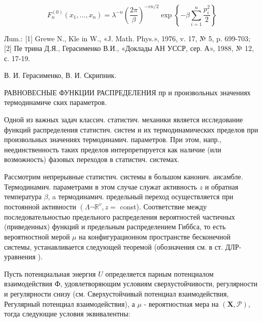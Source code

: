 \documentclass[10pt]{article}
\begin{document}
\[

F_{n}^{(0)}\left(x_{1}, \ldots, x_{n}\right)=\lambda^{-n}\left(\frac{2 \pi}{\beta}\right)^{-v n / 2} \exp \left\{-\beta \sum_{i=1}^{n} \frac{p_{i}^{2}}{2}\right\}

\]



Лum.: [1] Grewe N., Kle in W., «J. Math. Phys.», 1976, v. 17, № 5, p. 699-703; [2] Пе трина Д.Я., Герасименко В.И., «Доклады АН УССР, сер. А», 1988, № 12, с. 17-19.



В. И. Герасименко, В. И. Скрипник.



РАВНОВЕСНЫЕ ФУНКЦИИ РАСПРЕДЕЛЕНИЯ пр и произвольных значениях термодинамиче ских параметров.



Одной из важных задач классич. статистич. механики является исследование функций распределения статистич. систем и их термодинамических пределов при произвольных значениях термодинамич. параметров. При этом, напр., неединственность таких пределов интерпретируется как наличие (или возможность) фазовых переходов в статистич. системах.



Рассмотрим непрерывные статистич. системы в большом канонич. ансамбле. Термодинамич. параметрами в этом случае служат активность $z$ и обратная температура $\beta$, a термодинамич. предельный переход осуществляется при постоянной активности $\left(\Lambda \neg \mathbb{R}^{v}, z=\right.$ const). Соответствие между последовательностью предельного распределения вероятностей частичных (приведенных) функций и предельным распределением Гиббса, то есть вероятностной мерой $\mu$ на конфигурационном пространстве бесконечной системы, устанавливается следующей теоремой (обозначения см. в ст. ДЛР-уравнения ).



Пусть потенциальная энергия $U$ определяется парным потенциалом взаимодействия Ф, удовлетворяющим условиям сверхустойчивости, регулярности и регулярности снизу (см. Сверхустойчивый потенциал взаимодействия, Регулярный потенциал взаимодействия), а $\mu$ - вероятностная мера на $(\boldsymbol{X}, \mathscr{P})$, тогда следующие условия эквивалентны:
\end{document}
